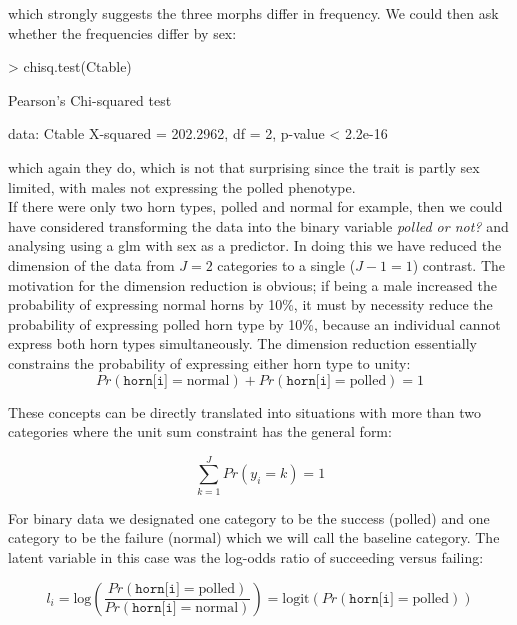 \documentclass{article}
\begin{document}
which strongly suggests the three morphs differ in frequency. We could then ask whether the frequencies differ by sex:

\begin{Schunk}
\begin{Sinput}
> chisq.test(Ctable)
\end{Sinput}
\begin{Soutput}
	Pearson's Chi-squared test

data:  Ctable 
X-squared = 202.2962, df = 2, p-value < 2.2e-16
\end{Soutput}
\end{Schunk}

which again they do, which is not that surprising since the trait is partly sex limited, with males not expressing the polled phenotype.\\

If there were only two horn types, polled and normal for example, then we could have considered transforming the data into the binary variable \emph{polled or not?} and analysing using a glm with sex as a predictor. In doing this we have reduced the dimension of the data from $J=2$ categories to a single ($J-1=1$) contrast. The motivation for the dimension reduction is obvious; if being a male increased the probability of expressing normal horns by 10\%, it must by necessity reduce the probability of expressing polled horn type by 10\%, because an individual cannot express both horn types  simultaneously.  The dimension reduction essentially constrains the probability of expressing either horn type to unity:\\

\begin{equation}
Pr(\texttt{horn[i]}=\textrm{normal})+Pr(\texttt{horn[i]}=\textrm{polled}) = 1
\end{equation}

These concepts can be directly translated into situations with more than two categories where the unit sum constraint has the general form:

\begin{equation}
\sum_{k=1}^{J}Pr(y_{i}=k)=1 
\end{equation}

 For binary data we designated one category to be the success (polled) and one category to be the failure (normal) which we will call the baseline category.  The latent variable in this case was the log-odds ratio  of succeeding versus failing:

\begin{equation}
 l_{i} = \textrm{log}\left(\frac{Pr(\texttt{horn[i]}=\textrm{polled})}{Pr(\texttt{horn[i]}=\textrm{normal})}\right) = \textrm{logit}\left(Pr(\texttt{horn[i]}=\textrm{polled})\right)
\end{equation}
\end{document}
